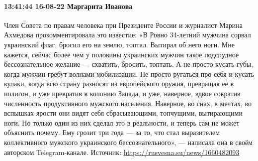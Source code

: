  
 
 
 
 

\paragraph{13:41:44 16-08-22 Маргарита Иванова}

\obeycr
Член Совета по правам человека при Президенте России и журналист Марина Ахмедова прокомментировала это известие:
«В Ровно 34-летний мужчина сорвал украинский флаг, бросил его на землю, топтал. Вытирал об него ноги. Мне кажется, сейчас более чем у половины украинских мужчин такое подспудное бессознательное желание — схватить, бросить, топтать. А не просто кусать губы, когда мужчин гребут волнами мобилизации.
Не просто ругаться про себя и кусать кулаки, когда всю страну разносят из европейского оружия, превращая ее в полигон, и уже превратив в колонию Запада, и уже, наверное, вдвое сократив численность продуктивного мужского населения.
Наверное, во снах, в мечтах, во вспышках ярости они видят себя сбрасывающими, топчущими, вытирающими ноги. Но только один из них сделал это в реальности, и теперь сам не может объяснить почему. Ему грозит три года — за то, что стал выразителем коллективного мужского украинского бессознательного», — написала она в своём авторском Telegram-канале.
Источник: \url{https://rusvesna.su/news/1660482093}
\restorecr
